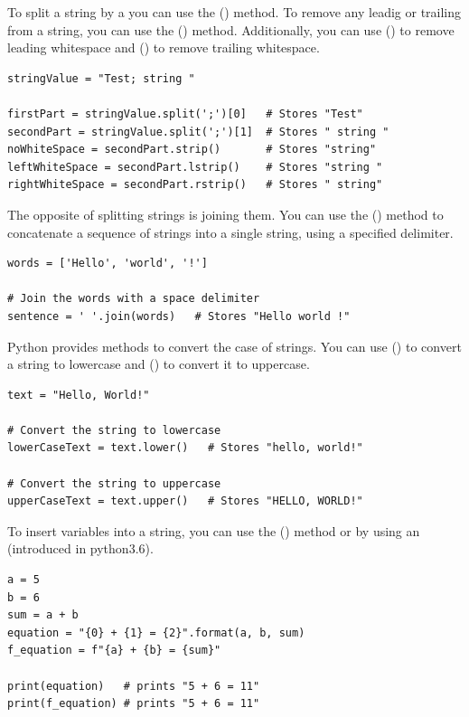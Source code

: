 To split a string by a  you can use the () method. To remove any leadig or trailing  from a string, you can use the () method. Additionally, you can use () to remove leading whitespace and () to remove trailing whitespace.
\begin{lstlisting}
stringValue = "Test; string "

firstPart = stringValue.split(';')[0] 	# Stores "Test"
secondPart = stringValue.split(';')[1]	# Stores " string "
noWhiteSpace = secondPart.strip()       # Stores "string"
leftWhiteSpace = secondPart.lstrip()    # Stores "string "
rightWhiteSpace = secondPart.rstrip()   # Stores " string"
\end{lstlisting}

The opposite of splitting strings is joining them. You can use the () method to concatenate a sequence of strings into a single string, using a specified delimiter.
\begin{lstlisting}
words = ['Hello', 'world', '!']

# Join the words with a space delimiter
sentence = ' '.join(words)   # Stores "Hello world !"
\end{lstlisting}

Python provides methods to convert the case of strings. You can use () to convert a string to lowercase and () to convert it to uppercase.

\begin{lstlisting}
text = "Hello, World!"

# Convert the string to lowercase
lowerCaseText = text.lower()   # Stores "hello, world!"

# Convert the string to uppercase
upperCaseText = text.upper()   # Stores "HELLO, WORLD!"
\end{lstlisting}

To insert variables into a string, you can use the () method or by using an  (introduced in python3.6).
\begin{lstlisting}
a = 5
b = 6
sum = a + b
equation = "{0} + {1} = {2}".format(a, b, sum)
f_equation = f"{a} + {b} = {sum}"

print(equation)   # prints "5 + 6 = 11"
print(f_equation) # prints "5 + 6 = 11"
\end{lstlisting}









